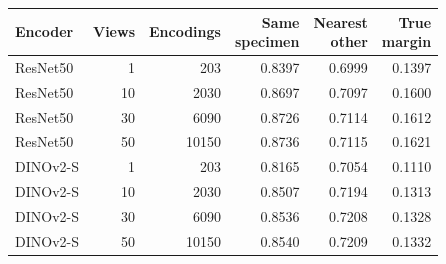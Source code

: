 \begin{tabular}{lrrrrr}
\toprule
Encoder & Views & Encodings & \makecell{Same\\specimen} & \makecell{Nearest\\other} & \makecell{True\\margin} \\
\midrule
ResNet50 & 1 & 203 & 0.8397 & 0.6999 & 0.1397 \\
ResNet50 & 10 & 2030 & 0.8697 & 0.7097 & 0.1600 \\
ResNet50 & 30 & 6090 & 0.8726 & 0.7114 & 0.1612 \\
ResNet50 & 50 & 10150 & 0.8736 & 0.7115 & 0.1621 \\
DINOv2-S & 1 & 203 & 0.8165 & 0.7054 & 0.1110 \\
DINOv2-S & 10 & 2030 & 0.8507 & 0.7194 & 0.1313 \\
DINOv2-S & 30 & 6090 & 0.8536 & 0.7208 & 0.1328 \\
DINOv2-S & 50 & 10150 & 0.8540 & 0.7209 & 0.1332 \\
\bottomrule
\end{tabular}
